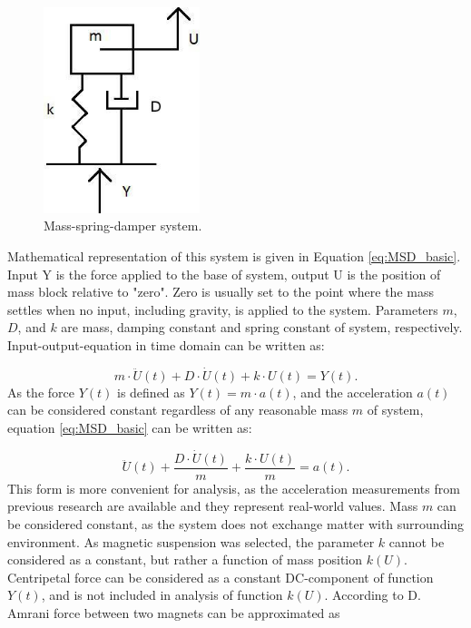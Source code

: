 \begin{figure}[htb]
\begin{center}
\includegraphics[height=6cm]{images/own_dwg/MSD.jpg}
\end{center}
\caption{\label{MSD} Mass-spring-damper system.}
\end{figure}

Mathematical representation of this system is given in Equation \eqref{eq:MSD_basic}. Input Y is the force applied to the base of system, output U is the position of mass block relative to "zero". Zero is usually set to the point where the mass settles when no input, including gravity, is applied to the system. Parameters $m$, $D$, and $k$ are mass, damping constant and spring constant of system, respectively. Input-output-equation in time domain can be written as: 

\begin{equation}\label{eq:MSD_basic}
  m \cdot \ddot{U}(t) + D \cdot \dot{U}(t) + k \cdot U(t) = Y(t). 
\end{equation}
As the force $ Y(t) $ is defined as $ Y(t) = m \cdot a(t) $, and the acceleration $ a(t)$ can be considered constant regardless of any reasonable mass $ m $ of system, equation \eqref{eq:MSD_basic} can be written as:

\begin{equation}\label{eq:MSD_acceleration}
 \ddot{U}(t) + \frac{D \cdot \dot{U}(t)}{m} + \frac{k \cdot U(t)}{m} = a(t). 
\end{equation}
This form is more convenient for analysis, as the acceleration measurements from previous research are available and they represent real-world values. Mass $m$ can be considered constant, as the system does not exchange matter with surrounding environment. As magnetic suspension was selected, the parameter $k$ cannot be considered as a constant, but rather a function of mass position $k(U)$. Centripetal force can be considered as a constant DC-component of function $Y(t)$, and is not included in analysis of function $k(U)$. According to D. Amrani \cite{Amrani2015} force between two magnets can be approximated as

